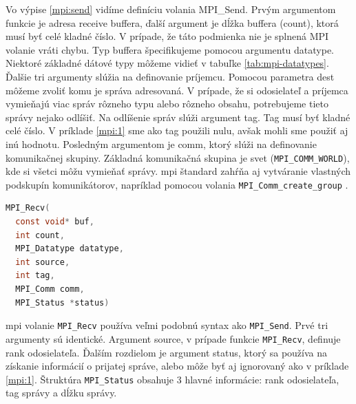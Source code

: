 Vo výpise \ref{mpi:send} vidíme definíciu volania MPI\_Send. Prvým argumentom funkcie je adresa receive buffera, ďalší argument je dĺžka buffera (count), ktorá musí byť celé kladné číslo.
V prípade, že táto podmienka nie je splnená MPI volanie vráti chybu. Typ buffera špecifikujeme pomocou argumentu datatype.
Niektoré základné dátové typy môžeme vidieť v tabuľke \ref{tab:mpi-datatypes}.
Ďalšie tri argumenty slúžia na definovanie príjemcu. Pomocou parametra dest môžeme zvoliť komu je správa adresovaná.
V prípade, že si odosielateľ a príjemca vymieňajú viac správ rôzneho typu alebo rôzneho obsahu, potrebujeme tieto správy nejako odlíšiť.
Na odlíšenie správ slúži argument tag. Tag musí byť kladné celé číslo. V príklade \ref{mpi:1} sme ako tag použili nulu,
avšak mohli sme použiť aj inú hodnotu. Posledným argumentom je comm, ktorý slúži na definovanie komunikačnej skupiny.
Základná komunikačná skupina je svet (\texttt{MPI\_COMM\_WORLD}), kde si všetci môžu vymieňať správy.
\acrshort{mpi} štandard zahŕňa aj vytváranie vlastných podskupín komunikátorov, napríklad pomocou volania \texttt{MPI\_Comm\_create\_group} \cite{mpi3-1}.

\begin{lstlisting}[language=c, caption={MPI\_Recv}, label={mpi:recv}]
  MPI_Recv(
  const void* buf,
  int count,
  MPI_Datatype datatype,
  int source,
  int tag,
  MPI_Comm comm,
  MPI_Status *status)
\end{lstlisting}

\acrshort{mpi} volanie \texttt{MPI\_Recv} používa veľmi podobnú syntax ako \texttt{MPI\_Send}. Prvé tri argumenty sú identické.
Argument source, v prípade funkcie \texttt{MPI\_Recv}, definuje rank odosielateľa. Ďalším rozdielom je argument status,
ktorý sa používa na získanie informácií o prijatej správe, alebo môže byť aj ignorovaný ako v príklade \ref{mpi:1}.
Štruktúra \texttt{MPI\_Status} obsahuje 3 hlavné informácie: rank odosielateľa, tag správy a dĺžku správy.

